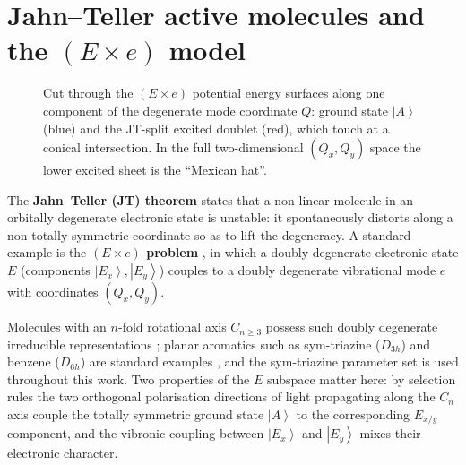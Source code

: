 \documentclass[12pt,a4paper]{article}
\newcommand{\ket}[1]{\left|#1\right\rangle}
\begin{document}
\section{Jahn--Teller active molecules and the $(E\times e)$ model}\label{sec:jt}

\begin{figure}[htbp]
\centering
{}
\caption{Cut through the $(E\times e)$ potential energy surfaces along one
component of the degenerate mode coordinate $Q$: ground state $\ket{A}$
(blue) and the JT-split excited doublet (red), which touch at a conical
intersection. In the full two-dimensional $(Q_x,Q_y)$ space the lower excited
sheet is the ``Mexican hat''.}
\label{fig:mexicanhat}
\end{figure}
\FloatBarrier

The \textbf{Jahn--Teller (JT) theorem} \cite{JahnTeller1937} states that a
non-linear molecule in an orbitally degenerate electronic state is unstable:
it spontaneously distorts along a non-totally-symmetric coordinate so as to
lift the degeneracy. A standard example is the \textbf{$(E\times e)$
problem} \cite{LonguetHiggins1958,Bersuker2006,Koppel1984}, in which a doubly
degenerate electronic state $E$ (components $\ket{E_x},\ket{E_y}$) couples to
a doubly degenerate vibrational mode $e$ with coordinates $(Q_x,Q_y)$.

Molecules with an $n$-fold rotational axis $C_{n\ge3}$ possess such doubly
degenerate irreducible representations \cite{Nandipati2023}; planar aromatics
such as sym-triazine ($D_{3h}$) and benzene ($D_{6h}$) are standard examples
\cite{Whetten1986,Harris1989}, and the sym-triazine parameter set is used
throughout this work. Two properties of the $E$ subspace matter here: by
selection rules the two orthogonal polarisation directions of light
propagating along the $C_n$ axis couple the totally symmetric ground state
$\ket{A}$ to the corresponding $E_{x/y}$ component, and the vibronic coupling
between $\ket{E_x}$ and $\ket{E_y}$ mixes their electronic character.
\end{document}

